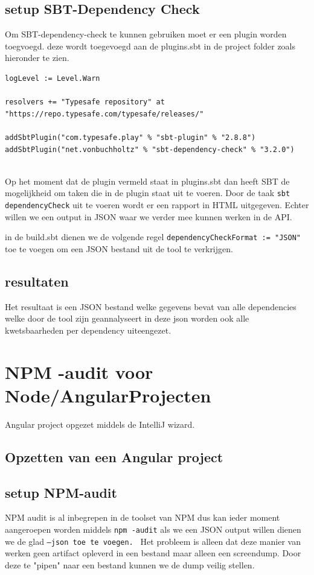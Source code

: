 \subsection{setup SBT-Dependency Check}\label{subsec:setup-sbt-dependency-check}
Om SBT-dependency-check te kunnen gebruiken moet er een plugin worden toegvoegd. deze wordt toegevoegd aan de plugins.sbt in de project folder zoals hieronder te zien.
\begin{lstlisting}[caption={plugin.sbt.sbt},label=lst:plugin.sbt]
logLevel := Level.Warn

resolvers += "Typesafe repository" at "https://repo.typesafe.com/typesafe/releases/"

addSbtPlugin("com.typesafe.play" % "sbt-plugin" % "2.8.8")
addSbtPlugin("net.vonbuchholtz" % "sbt-dependency-check" % "3.2.0")


\end{lstlisting}
Op het moment dat de plugin vermeld staat in plugins.sbt dan heeft SBT de mogelijkheid om taken die in de plugin staat uit te voeren. Door de taak \texttt{sbt dependencyCheck} uit te voeren wordt er een rapport in HTML uitgegeven. Echter willen we een output in JSON waar we verder mee kunnen werken in de API.

in de build.sbt dienen we de volgende regel \texttt{dependencyCheckFormat := "JSON"} toe te voegen om een JSON bestand uit de tool te verkrijgen.

\subsection{resultaten}\label{subsec:SBTResultaten}
Het resultaat is een JSON bestand welke gegevens bevat van alle dependencies welke door de tool zijn geannalyseert in deze json worden ook alle kwetsbaarheden per dependency uiteengezet.


\section{NPM -audit voor Node/AngularProjecten}\label{sec:npm--audit-voor-node/angularprojecten}
Angular project opgezet middels de IntelliJ wizard.

\subsection{Opzetten van een Angular project}\label{subsec:opzetten-van-een-project-ang}

\subsection{setup NPM-audit}\label{subsec:setup-npm-audit}
NPM audit is al inbegrepen in de toolset van NPM dus kan ieder moment aangeroepen worden middels \texttt{npm -audit} als we een JSON output willen dienen we de glad \texttt{--json toe te voegen. }
Het probleem is alleen dat deze manier van werken geen artifact opleverd in een bestand maar alleen een screendump.
Door deze te "pipen" naar een bestand kunnen we de dump veilig stellen.
